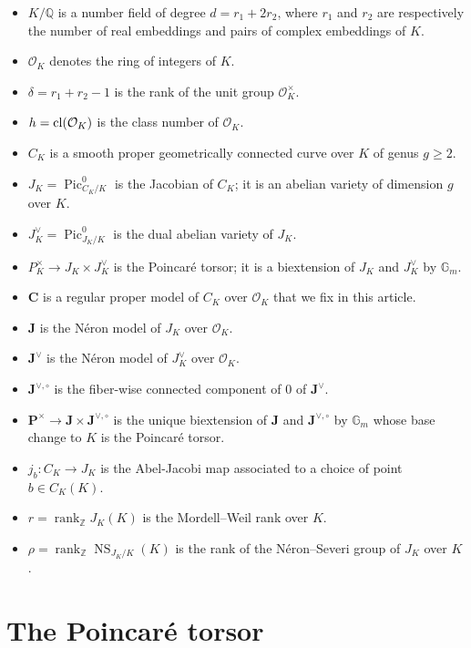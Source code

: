 \documentclass[11pt,oneside]{amsart}
\theoremstyle{plain}
\theoremstyle{definition}
\def\lra{{\longrightarrow}}
\def\G{{\bf G}}
\DeclareMathOperator{\NS}{NS}
\DeclareMathOperator{\Pic}{Pic}
\DeclareMathOperator{\rank}{rank} \DeclareMathOperator{\rig}{rig}
\def\Z{\mathbb{Z}}
\def\Q{\mathbb{Q}}
\def\J{\mathbf{J}}
\def\Jo{\mathbf{J}^{\vee,\circ}}
\def\G{\mathbb{G}}
\def\CC{\mathbf{C}}
\def\oh{\mathcal{O}}
\begin{document}
\begin{itemize}
\item $K/\Q$ is a number field of degree $d=r_1+2r_2$, where $r_1$ and $r_2$ are respectively the number of real embeddings and pairs of complex embeddings of $K$. 
\item $\oh_K$ denotes the ring of integers of $K$. 
\item $\delta=r_1+r_2-1$ is the rank of the unit group $\oh_K^\times$. 
\item $h=\cl(\oh_K)$ is the class number of $\oh_K$. 
\item $C_K$ is a smooth proper geometrically connected curve over $K$ of genus $g\geq 2$. 
\item $J_K=\Pic^0_{C_K/K}$ is the Jacobian of $C_K$; it is an abelian variety of dimension $g$ over $K$.
\item $J^{\vee}_{K}=\Pic^0_{J_K/K}$ is the dual abelian variety of $J_K$.
\item $P^\times_K\lra J_K\times J_K^\vee$ is the Poincar\'e torsor; it is a biextension of $J_K$ and $J_K^\vee$ by $\G_m$.
\item $\CC$ is a regular proper model of $C_K$ over $\oh_K$ that we fix in this article.
\item $\J$ is the N\'eron model of $J_K$ over $\oh_K$.
\item $\J^\vee$ is the N\'eron model of $J_K^\vee$ over $\oh_K$.
\item $\Jo$ is the fiber-wise connected component of $0$ of $\J^\vee$.
\item $\mathbf{P}^\times\lra \J\times \Jo$ is the unique biextension of $\J$ and $\Jo$ by $\G_m$ whose base change to $K$ is the Poincar\'e torsor.
\item $j_b : C_K\lra J_K$ is the Abel-Jacobi map associated to a choice of point $b\in C_K(K)$.
\item $r=\rank_{\Z} J_K(K)$ is the Mordell--Weil rank over $K$.
\item $\rho=\rank_{\Z} \NS_{J_K/K}(K)$ is the rank of the N\'eron--Severi group of $J_K$ over $K$.
\end{itemize}
 
 
 






\section{The Poincar\'e torsor} \label{s:torsor}
\end{document}
